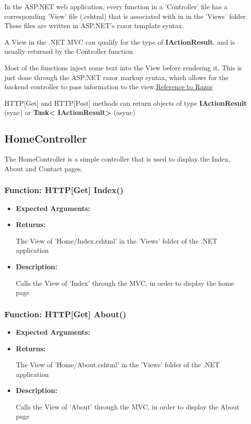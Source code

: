 \documentclass{scrreprt}
\begin{document}
In the ASP.NET web application, every function in a 'Controller' file has a
corresponding 'View' file (.cshtml) that is associated with in in the 'Views'
folder. These files are written in ASP.NET's razor template syntax.

A View in the .NET MVC can qualify for the type of \textbf{IActionResult}, and
is usually returned by the Controller function

Most of the functions inject some text into the View before rendering it. This
is just done through the ASP.NET razor markup syntax, which allows for the
backend controller to pass information to the
view.\href{https://docs.microsoft.com/en-us/aspnet/core/mvc/views/razor}
{Reference to Razor}

HTTP[Get] and HTTP[Post] methods can return objects of type
\textbf{IActionResult} (sync) or \textbf{Task\textless
IActionResult\textgreater} (async)

\subsection{HomeController}

The HomeController is a simple controller that is used to display the Index,
About and Contact pages.

\subsubsection{Function: HTTP[Get] Index()}

\begin{itemize}
        \item \textbf{Expected Arguments:}
        \item \textbf{Returns:}

                The View of 'Home/Index.cshtml' in the 'Views' folder of the
                .NET application

        \item \textbf{Description:}

                Calls the View of 'Index' through the MVC, in order to display
                the home page
\end{itemize}

\subsubsection{Function: HTTP[Get] About()}

\begin{itemize}
        \item \textbf{Expected Arguments:}
        \item \textbf{Returns:}

                The View of 'Home/About.cshtml' in the 'Views' folder of the .NET application

        \item \textbf{Description:}

                Calls the View of 'About' through the MVC, in order to display the About page
\end{itemize}
\end{document}
